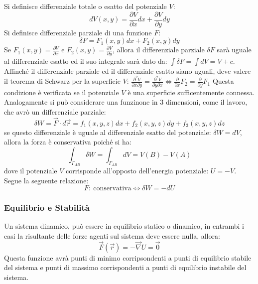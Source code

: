 \documentclass{article}
\numberwithin{equation}{subsection}
\begin{document}
Si definisce differenziale totale o esatto del potenziale $V$:
\begin{equation*}
    dV(x,y)=\displaystyle\frac{\partial V}{\partial x}dx+\frac{\partial V}{\partial y}dy
\end{equation*}
Si definisce differenziale parziale di una funzione $F$:
\begin{equation*}
    \delta F=F_1(x,y)dx+F_2(x,y)dy
\end{equation*}
Se $F_1(x,y) = \displaystyle\frac{\partial V}{\partial x}$ e 
$F_2(x,y) = \displaystyle\frac{\partial V}{\partial y}$, 
allora il differenziale parziale $\delta F$ sarà uguale al 
differenziale esatto ed il suo integrale sarà dato da:
$\displaystyle\int\delta F=\int dV=V+c$.
Affinché il differenziale parziale ed il differenziale esatto 
siano uguali, deve valere il teorema di Schwarz per la superficie 
$V$:
$\displaystyle\frac{\partial ^{2}V}{\partial x\partial y}=\frac{\partial ^{2}V}{\partial y\partial x}\iff \frac{\partial}{\partial x}F_2=\frac{\partial}{\partial y}F_1$
Questa condizione è verificata se il potenziale $V$ è una 
superficie sufficentemente connessa. 
Analogamente si può considerare una funzinone in $3$ dimensioni, 
come il lavoro, che avrò un differenziale parziale: 
\begin{equation*}
    \delta W=\vec{F}\cdot d\vec{r}=f_1(x,y,z)dx+f_2(x,y,z)dy+f_3(x,y,z)dz
\end{equation*}
se questo differenziale è uguale al differenziale 
esatto del potenziale: $\delta W =dV$, allora la forza 
è conservativa poiché si ha: 
\begin{equation}
    \int_{\Gamma_{AB}}\delta W = \int_{\Gamma_{AB}}dV=V(B)-V(A)
\end{equation}
dove il potenziale $V$ corrisponde all'opposto dell'energia 
potenziale: $U=-V$.
Segue la seguente relazione:
\begin{equation}
    F:\:\mbox{conservativa}\iff\delta W=-dU
\end{equation}

\subsubsection{Equilibrio e Stabilità}
Un sistema dinamico, può essere in equilibrio statico o dinamico, 
in entrambi i casi la risultante delle forze agenti sul sistema 
deve essere nulla, allora:
\begin{equation*}
    \vec{F}(\vec{r})=-\vec{\nabla}U=\vec{0}
\end{equation*}
Questa funzione avrà punti di minimo corripsondenti a 
punti di equilibrio stabile del sistema e punti di massimo 
corrispondenti a punti di equilibrio instabile del sistema. 
\end{document}
